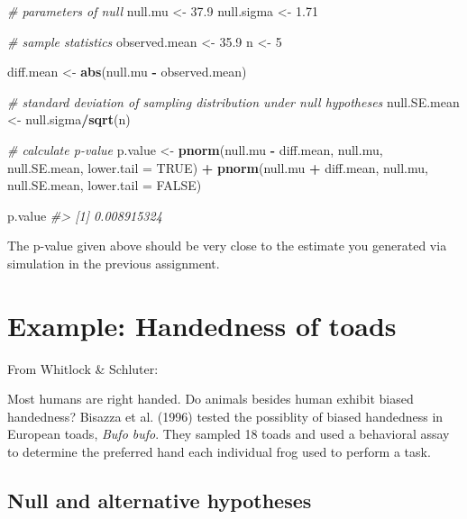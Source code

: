 \documentclass[]{book}
\newenvironment{Shaded}{\begin{snugshade}}{\end{snugshade}}
\newcommand{\CommentTok}[1]{\textcolor[rgb]{0.56,0.35,0.01}{\textit{#1}}}
\newcommand{\DataTypeTok}[1]{\textcolor[rgb]{0.13,0.29,0.53}{#1}}
\newcommand{\DecValTok}[1]{\textcolor[rgb]{0.00,0.00,0.81}{#1}}
\newcommand{\FloatTok}[1]{\textcolor[rgb]{0.00,0.00,0.81}{#1}}
\newcommand{\KeywordTok}[1]{\textcolor[rgb]{0.13,0.29,0.53}{\textbf{#1}}}
\newcommand{\NormalTok}[1]{#1}
\newcommand{\OperatorTok}[1]{\textcolor[rgb]{0.81,0.36,0.00}{\textbf{#1}}}
\newcommand{\OtherTok}[1]{\textcolor[rgb]{0.56,0.35,0.01}{#1}}
\newcommand{\StringTok}[1]{\textcolor[rgb]{0.31,0.60,0.02}{#1}}
\theoremstyle{definition}
\theoremstyle{definition}
\theoremstyle{definition}
\theoremstyle{remark}
\begin{document}
\begin{Shaded}
\begin{Highlighting}[]
\CommentTok{# parameters of null}
\NormalTok{null.mu <-}\StringTok{ }\FloatTok{37.9}
\NormalTok{null.sigma <-}\StringTok{ }\FloatTok{1.71}

\CommentTok{# sample statistics}
\NormalTok{observed.mean <-}\StringTok{ }\FloatTok{35.9}
\NormalTok{n <-}\StringTok{ }\DecValTok{5}

\NormalTok{diff.mean <-}\StringTok{ }\KeywordTok{abs}\NormalTok{(null.mu }\OperatorTok{-}\StringTok{ }\NormalTok{observed.mean)}

\CommentTok{# standard deviation of sampling distribution under null hypotheses}
\NormalTok{null.SE.mean <-}\StringTok{ }\NormalTok{null.sigma}\OperatorTok{/}\KeywordTok{sqrt}\NormalTok{(n)  }

\CommentTok{# calculate p-value }
\NormalTok{p.value <-}\StringTok{ }
\StringTok{  }\KeywordTok{pnorm}\NormalTok{(null.mu }\OperatorTok{-}\StringTok{ }\NormalTok{diff.mean, null.mu, null.SE.mean, }\DataTypeTok{lower.tail =} \OtherTok{TRUE}\NormalTok{) }\OperatorTok{+}\StringTok{ }
\StringTok{  }\KeywordTok{pnorm}\NormalTok{(null.mu }\OperatorTok{+}\StringTok{ }\NormalTok{diff.mean, null.mu, null.SE.mean, }\DataTypeTok{lower.tail =} \OtherTok{FALSE}\NormalTok{)}

\NormalTok{p.value}
\CommentTok{#> [1] 0.008915324}
\end{Highlighting}
\end{Shaded}

The p-value given above should be very close to the estimate you
generated via simulation in the previous assignment.

\hypertarget{example-handedness-of-toads}{%
\section{Example: Handedness of
toads}\label{example-handedness-of-toads}}

From Whitlock \& Schluter:

Most humans are right handed. Do animals besides human exhibit biased
handedness? Bisazza et al. (1996) tested the possiblity of biased
handedness in European toads, \emph{Bufo bufo}. They sampled 18 toads
and used a behavioral assay to determine the preferred hand each
individual frog used to perform a task.

\hypertarget{null-and-alternative-hypotheses-2}{%
\subsection{Null and alternative
hypotheses}\label{null-and-alternative-hypotheses-2}}
\end{document}
